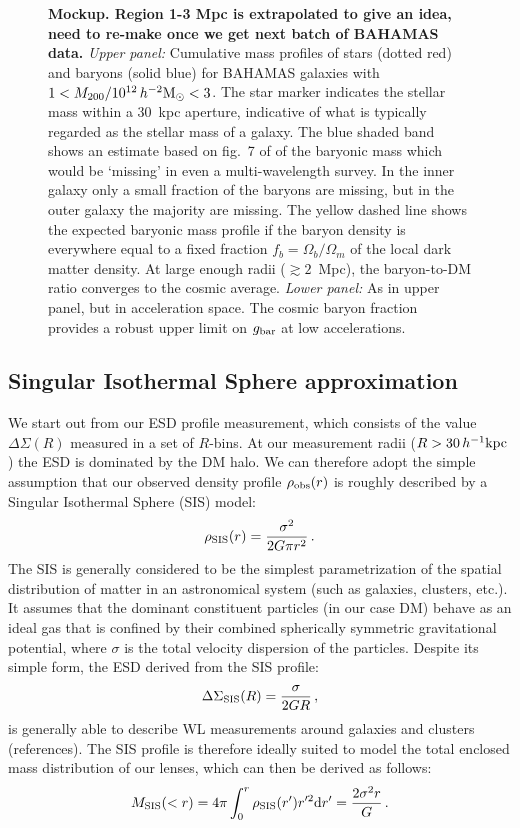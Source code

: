 \documentclass[usenatbib]{mnras}
\newcommand{\hmsun}{\,h^{-2} {\rm M_\odot}}
\newcommand{\hkpc}{\, h^{-1}{\rm{kpc}} }
\newcommand{\un}[1]{_{\rm #1}}
\begin{document}
\begin{figure}
	\caption{{\bf Mockup. Region 1-3 Mpc is extrapolated to give an idea, need to re-make once we get next batch of BAHAMAS data.} \emph{Upper panel: }Cumulative mass profiles of stars (dotted red) and baryons (solid blue) for BAHAMAS galaxies with $1<M_{200}/10^{12}\hmsun<3$. The star marker indicates the stellar mass within a $30$~kpc aperture, indicative of what is typically regarded as the stellar mass of a galaxy. The blue shaded band shows an estimate based on fig.~7 of \citet{Tumlinson17} of the baryonic mass which would be `missing' in even a multi-wavelength survey. In the inner galaxy only a small fraction of the baryons are missing, but in the outer galaxy the majority are missing. The yellow dashed line shows the expected baryonic mass profile if the baryon density is everywhere equal to a fixed fraction $f_b=\Omega_b/\Omega_m$ of the local dark matter density. At large enough radii ($\gtrsim 2$~Mpc), the baryon-to-DM ratio converges to the cosmic average. \emph{Lower panel: } As in upper panel, but in acceleration space. The cosmic baryon fraction provides a robust upper limit on $g_{\rm bar}$ at low accelerations.}
	\label{fig:missing-baryons}
\end{figure}


\subsection{Singular Isothermal Sphere approximation}
\label{sec:SIS_approximation}

We start out from our ESD profile measurement, which consists of the value $\Delta\Sigma(R)$ measured in a set of $R$-bins. At our measurement radii ($R>30 \hkpc$) the ESD is dominated by the DM halo. We can therefore adopt the simple assumption that our observed density profile $\rho\un{obs}(r)$ is roughly described by a Singular Isothermal Sphere (SIS) model:
\begin{equation}\label{eq:rho_SIS}
	\rho\un{SIS}(r) = \frac{\sigma^2}{2 G \pi r^2} \, . 
\end{equation}
The SIS is generally considered to be the simplest parametrization of the spatial distribution of matter in an astronomical system (such as galaxies, clusters, etc.). It assumes that the dominant constituent particles (in our case DM) behave as an ideal gas that is confined by their combined spherically symmetric gravitational potential, where $\sigma$ is the total velocity dispersion of the particles. Despite its simple form, the ESD derived from the SIS profile:
\begin{equation}\label{eq:ESD_SIS}
\Delta\Sigma\un{SIS}(R) = \frac{\sigma}{2 G R} \, ,
\end{equation}
is generally able to describe WL measurements around galaxies and clusters (references). The SIS profile is therefore ideally suited to model the total enclosed mass distribution of our lenses, which can then be derived as follows:
\begin{equation}\label{eq:mass_SIS}
	M\un{SIS}(<r) = 4 \pi \int_{0}^{r}\rho\un{SIS}(r') r'^2 {\rm d} r' = \frac{2\sigma^2 r}{G} \, .
\end{equation}
\end{document}
